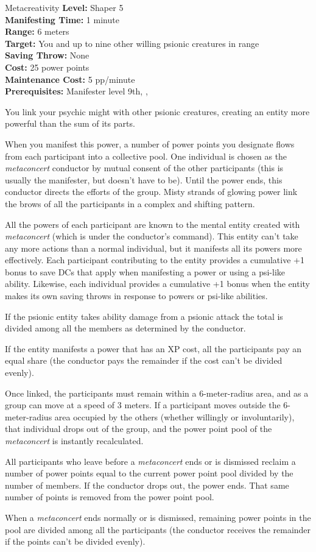 {Metacreativity}
{
	\textbf{Level:}
	Shaper 5\\
	\textbf{Manifesting Time:}
	1 minute\\
	\textbf{Range:}
	6 meters\\
	\textbf{Target:}
	You and up to nine other willing psionic creatures in range\\
	\textbf{Saving Throw:}
	None\\
	\textbf{Cost:}
	25 power points\\
	\textbf{Maintenance Cost:}
	5 pp/minute\\
	\textbf{Prerequisites:}
	Manifester level 9th, , \\
}
{
	You link your psychic might with other psionic creatures, creating an entity more powerful than the sum of its parts.

	When you manifest this power, a number of power points you designate flows from each participant into a collective pool. One individual is chosen as the \emph{metaconcert} conductor by mutual consent of the other participants (this is usually the manifester, but doesn't have to be). Until the power ends, this conductor directs the efforts of the group. Misty strands of glowing power link the brows of all the participants in a complex and shifting pattern.

	All the powers of each participant are known to the mental entity created with \emph{metaconcert} (which is under the conductor's command). This entity can't take any more actions than a normal individual, but it manifests all its powers more effectively. Each participant contributing to the entity provides a cumulative +1 bonus to save DCs that apply when manifesting a power or using a psi-like ability. Likewise, each individual provides a cumulative +1 bonus when the entity makes its own saving throws in response to powers or psi-like abilities.

	If the psionic entity takes ability damage from a psionic attack the total is divided among all the members as determined by the conductor.

	If the entity manifests a power that has an XP cost, all the participants pay an equal share (the conductor pays the remainder if the cost can't be divided evenly).

	Once linked, the participants must remain within a 6-meter-radius area, and as a group can move at a speed of 3 meters. If a participant moves outside the 6-meter-radius area occupied by the others (whether willingly or involuntarily), that individual drops out of the group, and the power point pool of the \emph{metaconcert} is instantly recalculated.

	All participants who leave before a \emph{metaconcert} ends or is dismissed reclaim a number of power points equal to the current power point pool divided by the number of members. If the conductor drops out, the power ends. That same number of points is removed from the power point pool.

	When a \emph{metaconcert} ends normally or is dismissed, remaining power points in the pool are divided among all the participants (the conductor receives the remainder if the points can't be divided evenly).
}